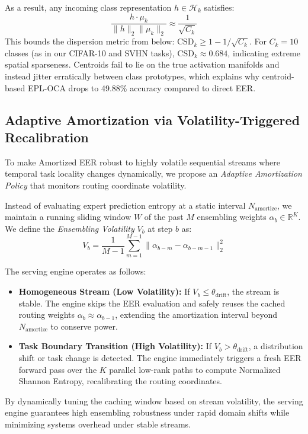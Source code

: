 \documentclass{article}
\theoremstyle{plain}
\theoremstyle{definition}
\theoremstyle{remark}
\begin{document}
As a result, any incoming class representation $h \in \mathcal{H}_k$ satisfies:
\begin{equation}
\frac{h \cdot \mu_k}{\|h\|_2 \|\mu_k\|_2} \approx \frac{1}{\sqrt{C_k}}
\end{equation}
This bounds the dispersion metric from below: $\text{CSD}_k \ge 1 - 1/\sqrt{C_k}$. For $C_k = 10$ classes (as in our CIFAR-10 and SVHN tasks), $\text{CSD}_k \approx 0.684$, indicating extreme spatial sparseness. Centroids fail to lie on the true activation manifolds and instead jitter erratically between class prototypes, which explains why centroid-based EPL-OCA drops to 49.88\% accuracy compared to direct EER.

\subsection{Adaptive Amortization via Volatility-Triggered Recalibration}
To make Amortized EER robust to highly volatile sequential streams where temporal task locality changes dynamically, we propose an \emph{Adaptive Amortization Policy} that monitors routing coordinate volatility.

Instead of evaluating expert prediction entropy at a static interval $N_{\text{amortize}}$, we maintain a running sliding window $W$ of the past $M$ ensembling weights $\alpha_b \in \mathbb{R}^K$. We define the \emph{Ensembling Volatility} $V_b$ at step $b$ as:
\begin{equation}
V_b = \frac{1}{M-1} \sum_{m=1}^{M-1} \|\alpha_{b-m} - \alpha_{b-m-1}\|_2^2
\end{equation}

The serving engine operates as follows:
\begin{itemize}
    \item \textbf{Homogeneous Stream (Low Volatility):} If $V_b \le \theta_{\text{drift}}$, the stream is stable. The engine skips the EER evaluation and safely reuses the cached routing weights $\alpha_b \approx \alpha_{b-1}$, extending the amortization interval beyond $N_{\text{amortize}}$ to conserve power.
    \item \textbf{Task Boundary Transition (High Volatility):} If $V_b > \theta_{\text{drift}}$, a distribution shift or task change is detected. The engine immediately triggers a fresh EER forward pass over the $K$ parallel low-rank paths to compute Normalized Shannon Entropy, recalibrating the routing coordinates.
\end{itemize}
By dynamically tuning the caching window based on stream volatility, the serving engine guarantees high ensembling robustness under rapid domain shifts while minimizing systems overhead under stable streams.
\end{document}
